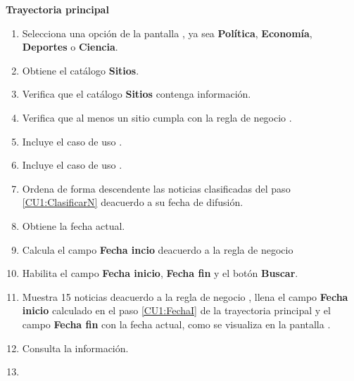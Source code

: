 

\begin{large}
	\textbf{Trayectoria principal}\\
\end{large}	

\begin{enumerate}[1.]
	
	\item \actor Selecciona una opción de la pantalla , ya sea \textbf{Política}, \textbf{Economía}, \textbf{Deportes} o \textbf{Ciencia}. 
	
	\item \sistema Obtiene el catálogo \textbf{Sitios}.
	
	\item \sistema Verifica que el catálogo \textbf{Sitios} contenga información. 
	
	\item \sistema Verifica que al menos un sitio cumpla con la regla de negocio . 
	
	\item \sistema Incluye el caso de uso .
	
	\item \sistema \label{CU1:ClasificarN}Incluye el caso de uso .
	
	\item \sistema Ordena de forma descendente las noticias clasificadas del paso \ref{CU1:ClasificarN} deacuerdo a su fecha de difusión.
	
	\item \sistema Obtiene la fecha actual.
	
	\item \sistema \label{CU1:FechaI}Calcula el campo \textbf{Fecha incio} deacuerdo a la regla de negocio 
	
	\item \sistema Habilita el campo \textbf{Fecha inicio}, \textbf{Fecha fin} y el botón \textbf{Buscar}.
	
	\item \sistema Muestra 15 noticias deacuerdo a la regla de negocio , llena el campo \textbf{Fecha inicio} calculado en el paso \ref{CU1:FechaI} de la trayectoria principal y el campo \textbf{Fecha fin} con la fecha actual, como se visualiza en la pantalla .

	\item \actor \label{CU1:Consulta}Consulta la información.


	
	\item \finCU	
\end{enumerate}



